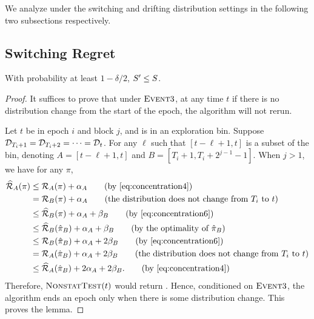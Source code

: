 We analyze \AdaBIN under the switching and drifting distribution settings in the following two subsections respectively. 
\subsection{Switching Regret}
\begin{lemma}
\label{thm: Ada3 not many rerun}
With probability at least $1-\delta/2$, $S^\prime\leq S$. 
\end{lemma}
\begin{proof}
It suffices to prove that under $\textsc{Event} 3$, at any time $t$ if there is no distribution change from the start of the epoch, the algorithm will not rerun. 

Let $t$ be in epoch $i$ and block $j$, and is in an exploration bin. Suppose ${\mathcal{D}}_{T_i+1} = {\mathcal{D}}_{T_i+2} = \cdots = {\mathcal{D}}_{t}$. For any $\ell$ such that $[t-\ell+1, t]$ is a subset of the bin, denoting $A=[t-\ell+1,t]$ and $B=[T_i+1, T_i+2^{j-1}-1]$. When $j>1$, we have for any $\pi$,
\begin{align*}
\avgR_{A}(\pi) & \leq \calR_{A}(\pi)+\alpha_{A} 
\tag{by \eqref{eq:concentration4}} \\
&= \calR_{B}(\pi)+\alpha_{A} 
\tag{the distribution does not change from $T_i$ to $t$}\\
&\leq \avgR_{B}(\pi)+\alpha_{A}+\beta_{B} 
\tag{by \eqref{eq:concentration6}}\\
&\leq \avgR_{B}(\hat{\pi}_{B})+\alpha_{A}+\beta_{B} 
\tag{by the optimality of $\hat{\pi}_B$}\\
&\leq \calR_{B}(\hat{\pi}_{B})+\alpha_{A}+2\beta_{B} 
\tag{by \eqref{eq:concentration6}} \\
&= \calR_{A}(\hat{\pi}_{B})+\alpha_{A}+2\beta_{B} 
\tag{the distribution does not change from $T_i$ to $t$}\\
&\leq \avgR_{A}(\hat{\pi}_{B})+2\alpha_{A}+2\beta_{B}. 
\tag{by \eqref{eq:concentration4}}
\end{align*}
Therefore, $\textsc{NonstatTest}(t)$ would return \false. Hence, conditioned on $\textsc{Event} 3$, the algorithm ends an epoch only when there is some distribution change. This proves the lemma. 

\end{proof}

